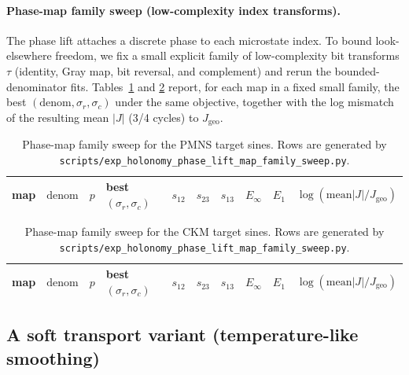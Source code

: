 \paragraph{Phase-map family sweep (low-complexity index transforms).}
The phase lift attaches a discrete phase to each microstate index.
To bound look-elsewhere freedom, we fix a small explicit family of low-complexity bit transforms $\tau$ (identity, Gray map, bit reversal, and complement) and rerun the bounded-denominator fits.
Tables~\ref{tab:holonomy_map_family_pmns} and \ref{tab:holonomy_map_family_ckm} report, for each map in a fixed small family, the best $(\mathrm{denom},\sigma_r,\sigma_c)$ under the same objective, together with the log mismatch of the resulting mean $|J|$ (3/4 cycles) to $J_{\mathrm{geo}}$.

\begin{table}[t]
\centering
\scriptsize
\setlength{\tabcolsep}{4pt}
\renewcommand{\arraystretch}{1.15}
\begin{tabular}{lrrlrrrrrr}
\toprule
map & $\mathrm{denom}$ & $p$ & best $(\sigma_r,\sigma_c)$ & $s_{12}$ & $s_{23}$ & $s_{13}$ & $E_\infty$ & $E_1$ & $\log(\mathrm{mean}|J|/J_{\mathrm{geo}})$ \\
\midrule
%
\end{tabular}
\caption{Phase-map family sweep for the PMNS target sines. Rows are generated by \texttt{scripts/exp\_holonomy\_phase\_lift\_map\_family\_sweep.py}.}
\label{tab:holonomy_map_family_pmns}
\end{table}

\begin{table}[t]
\centering
\scriptsize
\setlength{\tabcolsep}{4pt}
\renewcommand{\arraystretch}{1.15}
\begin{tabular}{lrrlrrrrrr}
\toprule
map & $\mathrm{denom}$ & $p$ & best $(\sigma_r,\sigma_c)$ & $s_{12}$ & $s_{23}$ & $s_{13}$ & $E_\infty$ & $E_1$ & $\log(\mathrm{mean}|J|/J_{\mathrm{geo}})$ \\
\midrule
%
\end{tabular}
\caption{Phase-map family sweep for the CKM target sines. Rows are generated by \texttt{scripts/exp\_holonomy\_phase\_lift\_map\_family\_sweep.py}.}
\label{tab:holonomy_map_family_ckm}
\end{table}

\subsection{A soft transport variant (temperature-like smoothing)}
\label{subsec:holonomy_soft_transport}

